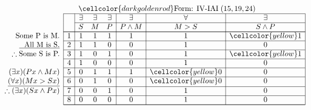 \documentclass[10pt,legalpaper,landscape,cmtt]{article}
\begin{document}
{\begin{minipage}[t]{3.25in}
	\)
\end{minipage}\begin{minipage}[t]{3.25in}
	\(
	\begin{array}{r|c|ccc|c|c|c|}
		\multicolumn{2}{c}{}&\multicolumn{6}{l}{\cellcolor{darkgoldenrod}\mbox{Form: IV-IAI}\; (15, 19, 24)} \\ \cline{2-8}
		\hspace{1in}	&	& \exists & \exists & \exists & \exists & \forall & \exists\\ \cline{3-8}
		&	& S & M & P &  P \wedge M  &  M > S  &  S \wedge P \\ \cline{2-8} \cline{2-8}
		\phantom{\therefore}\mbox{Some P is M.}   & 1 & 1 & 1 & 1 &   1   &   1   &   \cellcolor{yellow} 1  \\ \cline{2-8}
		\underline{\phantom{\therefore}\mbox{All M is S.}}   & 2 & 1 & 1 & 0 &   0   &   1   &   0  \\ \cline{2-8}
		\therefore \mbox{Some S is P.}   & 3 & 1 & 0 & 1 &   0   &   1   &   \cellcolor{yellow} 1  \\ \cline{2-8}
		& 4 & 1 & 0 & 0 &   0   &   1   &   0  \\ \cline{2-8}
		(\exists x)(Px \wedge Mx)   & 5 & 0 & 1 & 1 &   1   &   \cellcolor{yellow} 0   &   0  \\ \cline{2-8}
		\underline{(\forall x)(Mx > Sx)}   & 6 & 0 & 1 & 0 &   0   &   \cellcolor{yellow} 0   &   0  \\ \cline{2-8}
		\therefore(\exists x)(Sx \wedge Px)   & 7 & 0 & 0 & 1 &   0   &   1   &   0  \\ \cline{2-8}
		& 8 & 0 & 0 & 0 &   0   &   1   &   0   \\ \cline{2-8}\cline{2-8} 
	\end{array}
	\)
\end{minipage}

}
\end{document}
